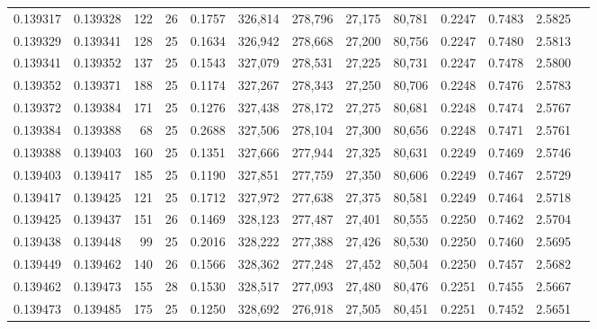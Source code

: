 \begin{tabular}{rrrrrrrrrrrrr}
0.139317 & 0.139328 &   122 &  26 &                                     0.1757 & 326,814 & 278,796 &  27,175 &  80,781 & 0.2247 & 0.7483 & 2.5825 \\
0.139329 & 0.139341 &   128 &  25 &                                     0.1634 & 326,942 & 278,668 &  27,200 &  80,756 & 0.2247 & 0.7480 & 2.5813 \\
0.139341 & 0.139352 &   137 &  25 &                                     0.1543 & 327,079 & 278,531 &  27,225 &  80,731 & 0.2247 & 0.7478 & 2.5800 \\
0.139352 & 0.139371 &   188 &  25 &                                     0.1174 & 327,267 & 278,343 &  27,250 &  80,706 & 0.2248 & 0.7476 & 2.5783 \\
0.139372 & 0.139384 &   171 &  25 &                                     0.1276 & 327,438 & 278,172 &  27,275 &  80,681 & 0.2248 & 0.7474 & 2.5767 \\
0.139384 & 0.139388 &    68 &  25 &                                     0.2688 & 327,506 & 278,104 &  27,300 &  80,656 & 0.2248 & 0.7471 & 2.5761 \\
0.139388 & 0.139403 &   160 &  25 &                                     0.1351 & 327,666 & 277,944 &  27,325 &  80,631 & 0.2249 & 0.7469 & 2.5746 \\
0.139403 & 0.139417 &   185 &  25 &                                     0.1190 & 327,851 & 277,759 &  27,350 &  80,606 & 0.2249 & 0.7467 & 2.5729 \\
0.139417 & 0.139425 &   121 &  25 &                                     0.1712 & 327,972 & 277,638 &  27,375 &  80,581 & 0.2249 & 0.7464 & 2.5718 \\
0.139425 & 0.139437 &   151 &  26 &                                     0.1469 & 328,123 & 277,487 &  27,401 &  80,555 & 0.2250 & 0.7462 & 2.5704 \\
0.139438 & 0.139448 &    99 &  25 &                                     0.2016 & 328,222 & 277,388 &  27,426 &  80,530 & 0.2250 & 0.7460 & 2.5695 \\
0.139449 & 0.139462 &   140 &  26 &                                     0.1566 & 328,362 & 277,248 &  27,452 &  80,504 & 0.2250 & 0.7457 & 2.5682 \\
0.139462 & 0.139473 &   155 &  28 &                                     0.1530 & 328,517 & 277,093 &  27,480 &  80,476 & 0.2251 & 0.7455 & 2.5667 \\
0.139473 & 0.139485 &   175 &  25 &                                     0.1250 & 328,692 & 276,918 &  27,505 &  80,451 & 0.2251 & 0.7452 & 2.5651 \\

\end{tabular}
